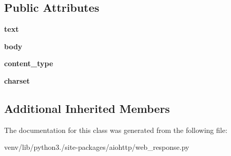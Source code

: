 \subsection*{Public Attributes}
\begin{DoxyCompactItemize}
\item 
\mbox{\label{classaiohttp_1_1web__response_1_1_response_a83779f5a381f6f373297bf1900f47565}} 
{\bfseries text}
\item 
\mbox{\label{classaiohttp_1_1web__response_1_1_response_a52ed3b835eab2c76d0a5e7cf4b9b2710}} 
{\bfseries body}
\item 
\mbox{\label{classaiohttp_1_1web__response_1_1_response_ac4b747f8d6c0dac4103e5613b14a2676}} 
{\bfseries content\+\_\+type}
\item 
\mbox{\label{classaiohttp_1_1web__response_1_1_response_a6a409a29a5f9a5b6c8592f97633e4e07}} 
{\bfseries charset}
\end{DoxyCompactItemize}
\subsection*{Additional Inherited Members}


The documentation for this class was generated from the following file\+:\begin{DoxyCompactItemize}
\item 
venv/lib/python3./site-\/packages/aiohttp/web\+\_\+response.\+py\end{DoxyCompactItemize}
